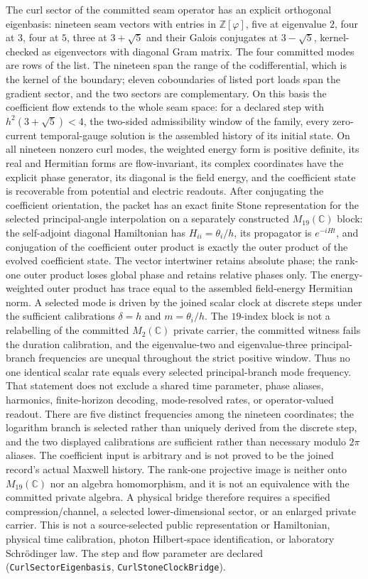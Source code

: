 \documentclass[11pt]{article}
\begin{document}
The curl sector of the committed seam operator has an explicit orthogonal
eigenbasis: nineteen seam vectors with entries in \(\mathbb Z[\varphi]\),
five at eigenvalue \(2\), four at \(3\), four at \(5\), three at
\(3+\sqrt5\) and their Galois conjugates at \(3-\sqrt5\), kernel-checked as
eigenvectors with diagonal Gram matrix. The four committed modes are rows of
the list. The nineteen span the range of the codifferential, which is the
kernel of the boundary; eleven coboundaries of listed port loads span the
gradient sector, and the two sectors are complementary. On this basis the
coefficient flow extends to the whole seam space: for a declared step with
\(h^2(3+\sqrt5) < 4\), the two-sided admissibility window of the family,
every zero-current temporal-gauge solution is the assembled history of its
initial state. On all nineteen nonzero curl modes, the weighted energy form
is positive definite, its real and Hermitian forms are flow-invariant, its
complex coordinates have the explicit phase generator, its diagonal is the
field energy, and the coefficient state is recoverable from potential and
electric readouts.  After conjugating the coefficient orientation, the packet
has an exact finite Stone representation for the selected principal-angle
interpolation on a separately constructed
$M_{19}(\mathbb C)$ block: the self-adjoint diagonal Hamiltonian has
$H_{ii}=\theta_i/h$, its propagator is $e^{-iH t}$, and conjugation of
the coefficient outer product is exactly the outer product of the evolved
coefficient state.  The vector intertwiner retains absolute phase; the
rank-one outer product loses global phase and retains relative phases only.
The energy-weighted outer product has trace equal to the assembled
field-energy Hermitian norm.  A selected mode is driven by the joined scalar
clock at discrete steps under the sufficient calibrations $\delta=h$ and
$m=\theta_i/h$.  The $19$-index block is not a
relabelling of the committed $M_2(\mathbb C)$ private carrier, the committed
witness fails the duration calibration, and the eigenvalue-two and
eigenvalue-three principal-branch frequencies are unequal throughout the
strict positive window.  Thus no one identical scalar rate equals every
selected principal-branch mode frequency.  That statement does not exclude a
shared time parameter, phase aliases, harmonics, finite-horizon decoding,
mode-resolved rates, or operator-valued readout.  There are five distinct
frequencies among the nineteen coordinates; the logarithm branch is selected
rather than uniquely derived from the discrete step, and the two displayed
calibrations are sufficient rather than necessary modulo $2\pi$ aliases.  The
coefficient input is arbitrary and is not proved to be the joined record's
actual Maxwell history.  The rank-one projective image is neither onto
$M_{19}(\mathbb C)$ nor an algebra homomorphism, and it is not an equivalence
with the committed private algebra.  A physical bridge therefore
requires a specified compression/channel, a selected lower-dimensional
sector, or an enlarged private carrier.  This is not a source-selected public
representation or Hamiltonian, physical time calibration, photon
Hilbert-space identification, or laboratory Schr\"odinger law.  The step and
flow parameter are declared
(\texttt{CurlSectorEigenbasis},
\texttt{CurlStoneClockBridge}).
\end{document}
